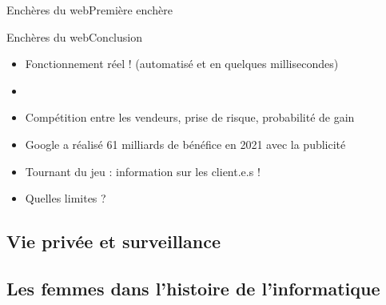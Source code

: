 \documentclass{beamer}
\begin{document}
\begin{frame}{Enchères du web}{Première enchère}

\end{frame}

\begin{frame}{Enchères du web}{Conclusion}
	\begin{itemize}
		\item Fonctionnement réel ! (automatisé et en quelques millisecondes)
		\item<2-> \href{https://fr.wikipedia.org/wiki/William_Vickrey}{}
		\item<3-> Compétition entre les vendeurs, prise de risque, probabilité de gain
		\item<4-> Google a réalisé 61 milliards de bénéfice en 2021 avec la publicité
		\item<5-> Tournant du jeu : information sur les client.e.s !
		\item<6-> Quelles limites ?
	\end{itemize}
\end{frame}

\lecture{}{}

\subsection{Vie privée et surveillance}

\subsection{Les femmes dans l'histoire de l'informatique}
\end{document}
